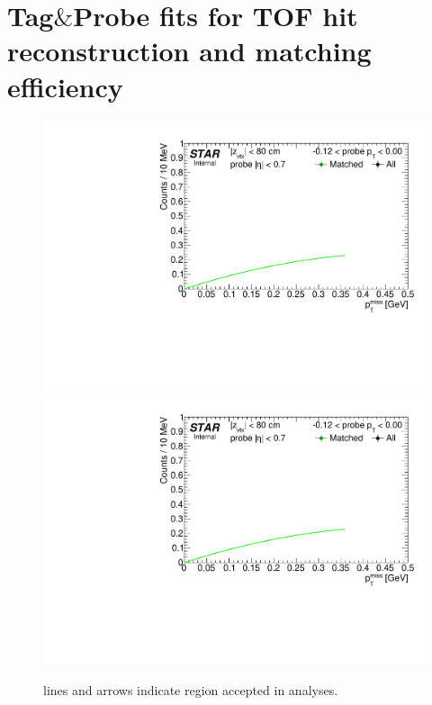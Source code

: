 
\chapter{Tag\texorpdfstring{$\&$}{&}Probe fits for TOF hit reconstruction and matching efficiency}\label{appendix:tagAndProbeTofEff}


\begin{figure}[h!]
\caption[TOF acceptance, reconstruction and matching efficiency of $\pi^{+}$.]{ lines and arrows indicate region accepted in analyses.}\label{fig:tagAndProbeTofEffFits_Pt}
\centering
\parbox{0.495\textwidth}{
  \centering
  \includegraphics[width=\linewidth,page=4]{graphics/systematicsEfficiency/TOF_tagAndProbe/Fitting_effVsPt_data.pdf}\\
  \includegraphics[width=\linewidth,page=5]{graphics/systematicsEfficiency/TOF_tagAndProbe/Fitting_effVsPt_data.pdf}\\
}
\end{figure}
